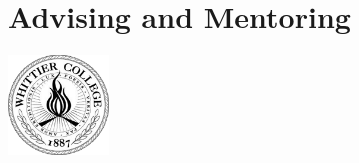 \documentclass[11pt]{book}
\begin{document}
\chapter{Advising and Mentoring}
\centering
\includegraphics[width=0.2\textwidth]{figures/WhittierCollegeSeal.png}
\begin{flushleft}

\end{flushleft}
 
\end{document}
